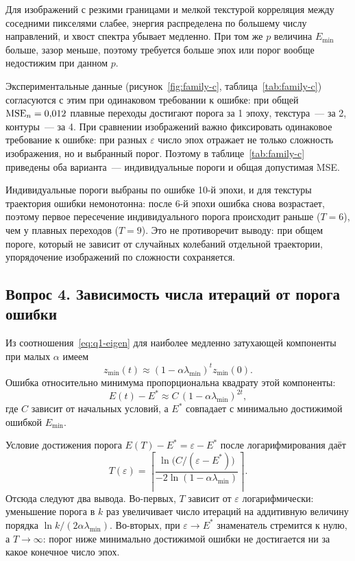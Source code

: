 Для изображений с резкими границами и мелкой текстурой корреляция между соседними пикселями слабее, энергия распределена по большему числу направлений, и хвост спектра убывает медленно. При том же $p$ величина $E_{\min}$ больше, зазор меньше, поэтому требуется больше эпох или порог вообще недостижим при данном $p$.

Экспериментальные данные (рисунок~\ref{fig:family-c}, таблица~\ref{tab:family-c}) согласуются с этим при одинаковом требовании к ошибке: при общей $\mathrm{MSE}_n=0{,}012$ плавные переходы достигают порога за 1 эпоху, текстура~--- за 2, контуры~--- за 4. При сравнении изображений важно фиксировать одинаковое требование к ошибке: при разных $\varepsilon$ число эпох отражает не только сложность изображения, но и выбранный порог. Поэтому в таблице~\ref{tab:family-c} приведены оба варианта~--- индивидуальные пороги и общая допустимая MSE.

Индивидуальные пороги выбраны по ошибке 10-й эпохи, и для текстуры траектория ошибки немонотонна: после 6-й эпохи ошибка снова возрастает, поэтому первое пересечение индивидуального порога происходит раньше ($T=6$), чем у плавных переходов ($T=9$). Это не противоречит выводу: при общем пороге, который не зависит от случайных колебаний отдельной траектории, упорядочение изображений по сложности сохраняется.

\subsection{Вопрос 4. Зависимость числа итераций от порога ошибки}

Из соотношения~\eqref{eq:q1-eigen} для наиболее медленно затухающей компоненты при малых $\alpha$ имеем
\begin{equation}
	z_{\min}(t)\approx(1-\alpha\lambda_{\min})^t z_{\min}(0).
\end{equation}
Ошибка относительно минимума пропорциональна квадрату этой компоненты:
\begin{equation}
	E(t)-E^*\approx C\,(1-\alpha\lambda_{\min})^{2t},
	\label{eq:q4-decay}
\end{equation}
где $C$ зависит от начальных условий, а $E^*$ совпадает с минимально достижимой ошибкой $E_{\min}$.

Условие достижения порога $E(T)-E^*=\varepsilon-E^*$ после логарифмирования даёт
\begin{equation}
	T(\varepsilon)=
	\left\lceil
	\frac{\ln\!\bigl(C/(\varepsilon-E^*)\bigr)}
	     {-2\ln(1-\alpha\lambda_{\min})}
	\right\rceil .
	\label{eq:q4-T}
\end{equation}
Отсюда следуют два вывода. Во-первых, $T$ зависит от $\varepsilon$ логарифмически: уменьшение порога в $k$ раз увеличивает число итераций на аддитивную величину порядка $\ln k/(2\alpha\lambda_{\min})$. Во-вторых, при $\varepsilon\to E^*$ знаменатель стремится к нулю, а $T\to\infty$: порог ниже минимально достижимой ошибки не достигается ни за какое конечное число эпох.

